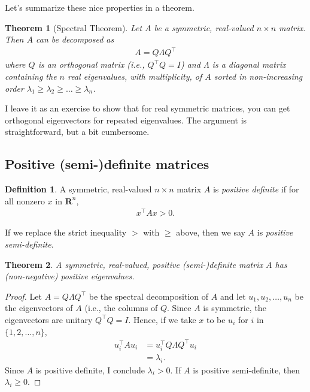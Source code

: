 \documentclass[]{article}
\theoremstyle{plain}
\newtheorem{thm}{Theorem}
\theoremstyle{definition}
\newtheorem{defn}{Definition}
\theoremstyle{remark}
\newcommand{\reals}{\mathbf{R}}
\begin{document}
Let's summarize these nice properties in a theorem.

\begin{thm}[Spectral Theorem]
Let $A$ be a symmetric, real-valued $n \times n$ matrix. Then $A$ can be
decomposed as
\begin{align*}
A = Q\Lambda Q^\top
\end{align*}
where $Q$ is an orthogonal matrix (i.e., $Q^\top Q = I$) and $\Lambda$ is a
diagonal matrix containing the $n$ real eigenvalues, with multiplicity, of
$A$ sorted in non-increasing order
$\lambda_1 \ge \lambda_2 \ge \dots \ge \lambda_n$.
\end{thm}

I leave it as an exercise to show that for real symmetric matrices, you can
get orthogonal eigenvectors for repeated eigenvalues. The argument is straightforward,
but a bit cumbersome. 

\subsection{Positive (semi-)definite
matrices}\label{positive-semi-definite-matrices}

\begin{defn}
A symmetric, real-valued $n \times n$ matrix $A$ is \emph{positive
definite} if for all nonzero $x$ in $\reals^n$,
\begin{align*}
x^\top Ax > 0.
\end{align*}
\end{defn}

If we replace the strict inequality $>$ with $\ge$ above, then we say $A$
is \emph{positive semi-definite}.

\begin{thm}
A symmetric, real-valued, positive (semi-)definite matrix $A$ has (non-negative)
positive eigenvalues.
\end{thm}
\begin{proof}
Let $A = Q\Lambda Q^\top$ be the spectral decomposition of $A$ and let
$u_1, u_2, \dots, u_n$ be the eigenvectors of $A$ (i.e., the columns
of $Q$.  Since $A$ is symmetric, the eigenvectors are unitary $Q^\top Q = I$.
Hence, if we take $x$ to be $u_i$ for $i$ in $\{1, 2, \dots, n\}$,
\begin{align*}
u_i^\top Au_i &= u_i^\top Q\Lambda Q^\top u_i \\
  &= \lambda_i.
\end{align*}
Since $A$ is positive definite, I conclude $\lambda_i > 0$.  If $A$ is
positive semi-definite, then $\lambda_i \ge 0$.
\end{proof}
\end{document}
